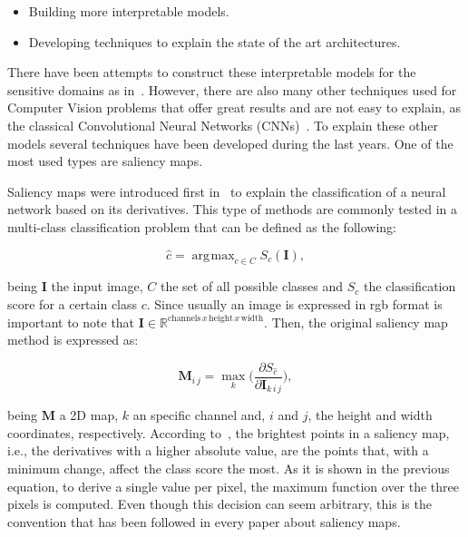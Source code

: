 \documentclass[preprint,12pt]{elsarticle}
\DeclareMathOperator*{\argmax}{arg\!max}
\begin{document}
\begin{itemize}
    \item Building more interpretable models.
    \item Developing techniques to explain the state of the art architectures.
\end{itemize}

There have been attempts to construct these interpretable models for the sensitive domains as in~\cite{singhThinkPositiveInterpretable2022}. However, there are also many other techniques used for Computer Vision problems that offer great results and are not easy to explain, as the classical Convolutional Neural Networks (CNNs)~\cite{lecunConvolutionalNetworksImages}. To explain these other models  several techniques have been developed during the last years. One of the most used types are saliency maps.

Saliency maps were introduced first in~\cite{simonyanDeepConvolutionalNetworks2014} to explain the classification of a neural network based on its derivatives. This type of methods are commonly tested in a multi-class classification problem that can be defined as the following:

\begin{equation}
    \label{eq: cnn output}
    \hat{c} = \argmax_{c \in C}S_c(\boldsymbol{I}),
\end{equation}

\noindent
being $\boldsymbol{I}$ the input image, $C$ the set of all possible classes and $S_c$ the classification score for a certain class $c$. Since usually an image is expressed in rgb format is important to note that $\boldsymbol{I} \in \mathbb{R}^{\text{channels}\, x\, \text{height}\, x\, \text{width}}$. Then, the original saliency map method is expressed as:

\begin{equation}
    \label{eq: 3d saliency map}
    \boldsymbol{M}_{i\, j} = \max_{k} \bigg ( \frac{\partial S_{\hat{c}}}{\partial \boldsymbol{I}_{k\, i\, j}} \bigg ),
\end{equation}

\noindent
being $\boldsymbol{M}$ a 2D map, $k$ an specific channel and, $i$ and $j$, the height and width coordinates, respectively. According to~\cite{simonyanDeepConvolutionalNetworks2014}, the brightest points in a saliency map, i.e., the derivatives with a higher absolute value, are the points that, with a minimum change, affect the class score the most. As it is shown in the previous equation, to derive a single value per pixel, the maximum function over the three pixels is computed. Even though this decision can seem arbitrary, this is the convention that has been followed in every paper about saliency maps.
\end{document}
